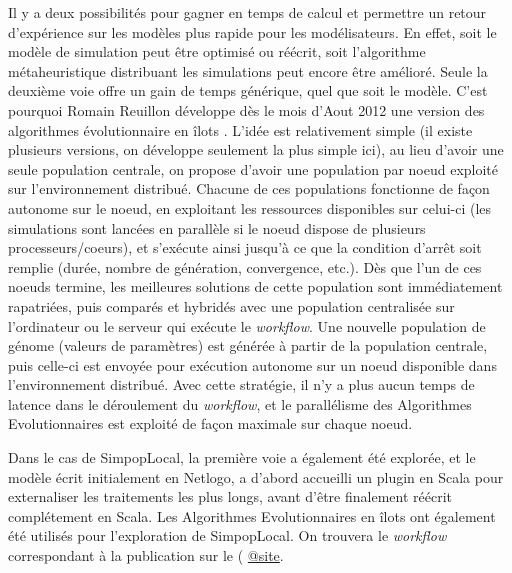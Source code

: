 Il y a deux possibilités pour gagner en temps de calcul et permettre un retour d'expérience sur les modèles plus rapide pour les modélisateurs. En effet, soit le modèle de simulation peut être optimisé ou réécrit, soit l'algorithme métaheuristique distribuant les simulations peut encore être amélioré. Seule la deuxième voie offre un gain de temps générique, quel que soit le modèle. C'est pourquoi Romain Reuillon développe dès le mois d'Aout 2012 une version des algorithmes évolutionnaire en îlots \autocite{Whitley1997}. L'idée est relativement simple (il existe plusieurs versions, on développe seulement la plus simple ici), au lieu d'avoir une seule population centrale, on propose d'avoir une population par noeud exploité sur l'environnement distribué. Chacune de ces populations fonctionne de façon autonome sur le noeud, en exploitant les ressources disponibles sur celui-ci (les simulations sont lancées en parallèle si le noeud dispose de plusieurs processeurs/coeurs), et s'exécute ainsi jusqu'à ce que la condition d'arrêt soit remplie (durée, nombre de génération, convergence, etc.). Dès que l'un de ces noeuds termine, les meilleures solutions de cette population sont immédiatement rapatriées, puis comparés et hybridés avec une population centralisée sur l'ordinateur ou le serveur qui exécute le \textit{workflow}. Une nouvelle population de génome (valeurs de paramètres) est générée à partir de la population centrale, puis celle-ci est envoyée pour exécution autonome sur un noeud disponible dans l'environnement distribué. Avec cette stratégie, il n'y a plus aucun temps de latence dans le déroulement du \textit{workflow}, et le parallélisme des Algorithmes Evolutionnaires est exploité de façon maximale sur chaque noeud.

Dans le cas de SimpopLocal, la première voie a également été explorée, et le modèle écrit initialement en Netlogo, a d'abord accueilli un plugin en Scala pour externaliser les traitements les plus longs, avant d'être finalement réécrit complétement en Scala. Les Algorithmes Evolutionnaires en îlots ont également été utilisés pour l'exploration de SimpopLocal. On trouvera le \textit{workflow} correspondant à la publication \autocite{Schmitt2015} sur le ( \href{http://iscpif.github.io/ simpoplocal-epb/}{@site}.
